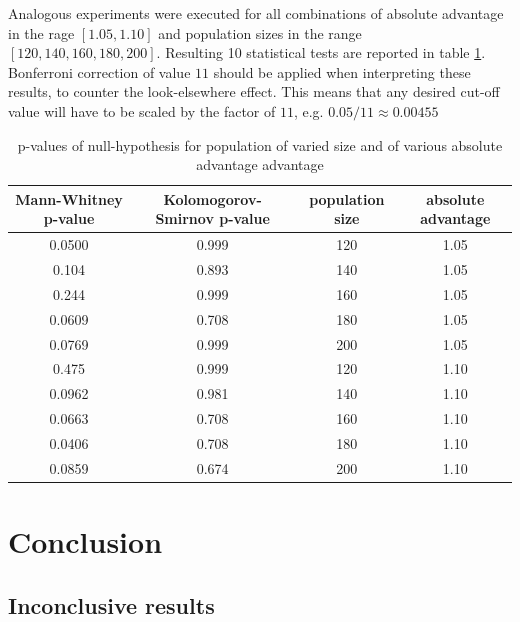\documentclass{l4proj}
\begin{document}
Analogous experiments were executed for all combinations of absolute advantage in the rage $[1.05, 1.10]$ and population sizes in the range $[120, 140, 160, 180, 200]$. Resulting 10 statistical tests are reported in table \ref{megaTable}. Bonferroni correction of value $11$ should be applied when interpreting these results, to counter the look-elsewhere effect. This means that any desired cut-off value will have to be scaled by the factor of $11$, e.g. $0.05/11 \approx 0.00455$

\begin{table}[]\label{megaTable}
    \centering
    \begin{tabular}{|c|c|c|c|}
    \hline
    Mann-Whitney p-value & Kolomogorov-Smirnov p-value & population size & absolute advantage  \\ \hline
    0.0500 & 0.999 & 120 & 1.05  \\ \hline
    0.104 & 0.893 & 140 & 1.05   \\ \hline
    0.244 & 0.999 & 160 & 1.05   \\ \hline
    0.0609 & 0.708 & 180 & 1.05  \\ \hline
    0.0769 & 0.999 & 200 & 1.05  \\ \hline
    0.475 & 0.999 & 120 & 1.10   \\ \hline
    0.0962 & 0.981 & 140 & 1.10  \\ \hline
    0.0663 & 0.708 & 160 & 1.10  \\ \hline
    0.0406 & 0.708 & 180 & 1.10  \\ \hline
    0.0859 & 0.674 & 200 & 1.10  \\ \hline
    \end{tabular}
    \caption{p-values of null-hypothesis for population of varied size and of various absolute advantage advantage}
\end{table}


\chapter{Conclusion}\label{conclusion}

\section{Inconclusive results}
\end{document}
